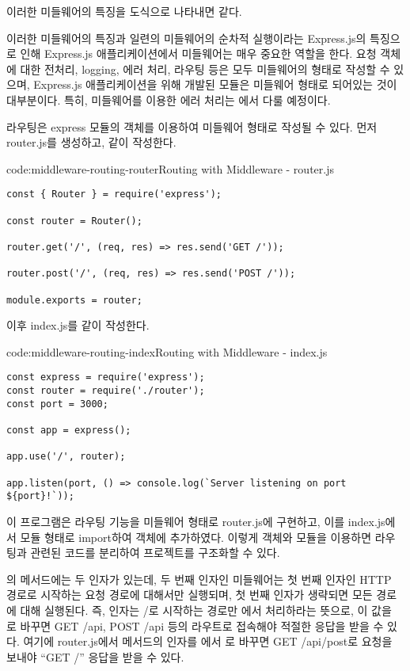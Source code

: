 이러한 미들웨어의 특징을 도식으로 나타내면 \와 같다.


이러한 미들웨어의 특징과 일련의 미들웨어의 순차적 실행이라는 Express.js의 특징으로 인해 Express.js 애플리케이션에서 미들웨어는 매우 중요한 역할을 한다. 요청 객체에 대한 전처리, logging, 에러 처리, 라우팅 등은 모두 미들웨어의 형태로 작성할 수 있으며, Express.js 애플리케이션을 위해 개발된 모듈은 미들웨어 형태로 되어있는 것이 대부분이다. 특히, 미들웨어를 이용한 에러 처리는 에서 다룰 예정이다.

라우팅은 express 모듈의  객체를 이용하여 미들웨어 형태로 작성될 수 있다. 먼저 router.js를 생성하고, \와 같이 작성한다.

\begin{codeenv}{code:middleware-routing-router}{Routing with Middleware - router.js}\begin{verbatim}
const { Router } = require('express');

const router = Router();

router.get('/', (req, res) => res.send('GET /'));

router.post('/', (req, res) => res.send('POST /'));

module.exports = router;
\end{verbatim}
\end{codeenv}
\clearpage

이후 index.js를 \와 같이 작성한다.

\begin{codeenv}{code:middleware-routing-index}{Routing with Middleware - index.js}\begin{verbatim}
const express = require('express');
const router = require('./router');
const port = 3000;

const app = express();

app.use('/', router);

app.listen(port, () => console.log(`Server listening on port ${port}!`));
\end{verbatim}
\end{codeenv}

이 프로그램은 라우팅 기능을 미들웨어 형태로 router.js에 구현하고, 이를 index.js에서 모듈 형태로 import하여  객체에 추가하였다. 이렇게  객체와 모듈을 이용하면 라우팅과 관련된 코드를 분리하여 프로젝트를 구조화할 수 있다.

의  메서드에는 두 인자가 있는데, 두 번째 인자인 미들웨어는 첫 번째 인자인 HTTP 경로로 시작하는 요청 경로에 대해서만 실행되며, 첫 번째 인자가 생략되면 모든 경로에 대해 실행된다. 즉,  인자는 /로 시작하는 경로만 에서 처리하라는 뜻으로, 이 값을 로 바꾸면 GET /api, POST /api 등의 라우트로 접속해야 적절한 응답을 받을 수 있다. 여기에 router.js에서  메서드의 인자를 에서 로 바꾸면 GET /api/post로 요청을 보내야 ``GET /'' 응답을 받을 수 있다.
